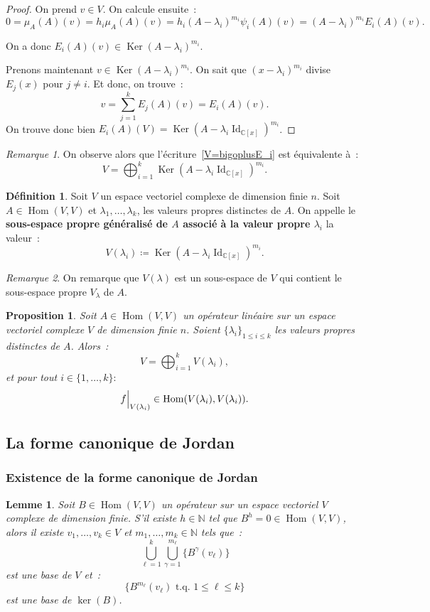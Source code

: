 \documentclass{article}
\DeclareMathOperator{\Id}{Id}
\DeclareMathOperator{\Ker}{Ker}
\DeclareMathOperator{\Hom}{Hom}
\newcommand{\N}{\mathbb N}
\newcommand{\C}{\mathbb C}
\newcommand{\restr}[2]{ %
	\left.\kern-\nulldelimiterspace %
	#1 %
	\vphantom{\big|} %
	\right|_{#2} %
}
\newcommand{\tq}{\textrm{ t.q. }}
\newtheorem{prp}[thm]{Proposition}
\newtheorem{lem}[thm]{Lemme}
\theoremstyle{definition}
\newtheorem{déf}[thm]{Définition}
\theoremstyle{remark}
\newtheorem*{rmq}{Remarque}
\begin{document}
		\begin{proof} On prend $v \in V$. On calcule ensuite~:
		\[0 = \mu_A(A)(v) = h_i\mu_A(A)(v) = h_i(A - \lambda_i)^{m_i}\psi_i(A)(v) = (A-\lambda_i)^{m_i}E_i(A)(v).\]

		On a donc $E_i(A)(v) \in \Ker(A - \lambda_i)^{m_i}$.

		Prenons maintenant $v \in \Ker(A - \lambda_i)^{m_i}$. On sait que $(x-\lambda_i)^{m_i}$ divise $E_j(x)$ pour $j \neq i$.
		Et donc, on trouve~: \[v = \sum_{j=1}^kE_j(A)(v) = E_i(A)(v).\]
		On trouve donc bien $E_i(A)(V) = \Ker(A-\lambda_i\Id_{\C[x]})^{m_i}$. \end{proof}

		\begin{rmq} On observe alors que l'écriture~\eqref{V=bigoplusE_i} est équivalente à~:
		\[V = \bigoplus_{i=1}^k\Ker(A - \lambda_i\Id_{\C[x]})^{m_i}.\]
		\end{rmq}

		\begin{déf} Soit $V$ un espace vectoriel complexe de dimension finie $n$. Soit $A \in \Hom(V, V)$ et $\lambda_1, \dotsc, \lambda_k$, les valeurs propres
		distinctes de $A$. On appelle le \textbf{sous-espace propre généralisé de $A$ associé à la valeur propre $\lambda_i$} la valeur~:
		\[V(\lambda_i) \coloneqq \Ker(A - \lambda_i \Id_{\C[x]})^{m_i}.\] \end{déf}

		\begin{rmq} On remarque que $V(\lambda)$ est un sous-espace de $V$ qui contient le sous-espace propre $V_\lambda$ de $A$. \end{rmq}

		\begin{prp} Soit $A \in \Hom(V, V)$ un opérateur linéaire sur un espace vectoriel complexe $V$ de dimension finie $n$. Soient $\{\lambda_i\}_{1 \leq i \leq k}$
		les valeurs propres distinctes de $A$. Alors~:
		\begin{equation}
			V = \bigoplus_{i=1}^kV(\lambda_i),
		\end{equation}
		et pour tout $i \in \{1, \dotsc, k\} :$
		\[\restr f{V(\lambda_i)} \in \Hom(V(\lambda_i), V(\lambda_i)).\]
		\end{prp}

	\subsection{La forme canonique de Jordan}
		\subsubsection{Existence de la forme canonique de Jordan}
		\begin{lem} Soit $B \in \Hom(V, V)$ un opérateur sur un espace vectoriel $V$ complexe de dimension finie. S'il existe $h \in \N$ tel que
		$B^h = 0 \in \Hom(V, V)$, alors il existe $v_1, \dotsc, v_k \in V$ et $m_1, \dotsc, m_k \in \N$ tels que~:
		\[\bigcup_{\ell = 1}^k\bigcup_{\gamma = 1}^{m_\ell}\{B^\gamma(v_\ell)\}\]
		est une base de $V$ et~:
		\[\{B^{m_\ell}(v_\ell) \tq 1 \leq \ell \leq k\}\]
		est une base de $\ker(B)$.
		\end{lem}
\end{document}
